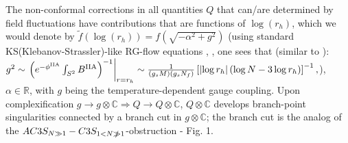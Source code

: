 \documentclass[a4paper,11pt,fleqn]{article}
\theoremstyle{plain}
\theoremstyle{definition}
\begin{document}
The non-conformal corrections in all quantities $Q$ that can/are determined by field fluctuations have contributions that are functions of $\log  (r_h) $, which we would denote by $\tilde{f}(\log  (r_h) ) = f(\sqrt{-\alpha^2 + g^2})$ (using standard KS(Klebanov-Strassler)-like RG-flow equations \cite{Klebanov:2000hb}, \cite{IITR-McGill-bulk-viscosity}, one sees that (similar to \cite{effec_kin_model_zetaovereta}):
{\footnotesize
$g^2 \sim \left.\left(e^{-\phi^{\rm IIA}}\int_{S^2}B^{\rm IIA}\right)^{-1}\right|_{r=r_h}
\sim\frac{1}{(g_s M) (g_s N_f)}\left[\left|\log r_h\right| \left(\log N - 3 \log r_h\right)\right]^{-1},$}), $\alpha\in\mathbb{R}$, with $g$ being the temperature-dependent gauge coupling. Upon complexification $g\rightarrow g\otimes\mathbb{C}\Rightarrow Q\rightarrow Q\otimes\mathbb{C}$, $Q\otimes\mathbb{C}$ develops branch-point singularities connected by a branch cut in $g\otimes\mathbb{C}$; the branch cut is the analog of the $AC3S_{N\gg1}-C3S_{1<N\slashed{\gg}1}$-obstruction - Fig. 1.
\end{document}
